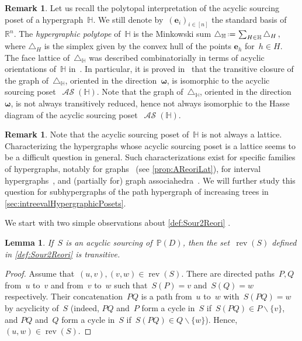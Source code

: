 \documentclass{amsart}
\newtheorem{lemma}[theorem]{Lemma}
\theoremstyle{definition}
\newtheorem{remark}[theorem]{Remark}
\newcommand{\R}{\mathbb{R}} %
\renewcommand{\b}[1]{\boldsymbol{#1}} %
\newcommand{\ssm}{\smallsetminus} %
\newcommand{\eqdef}{\mbox{\,\raisebox{0.2ex}{\scriptsize\ensuremath{\mathrm:}}\ensuremath{=}\,}} %
\newcommand{\simplex}{\triangle} %
\newcommand{\darkblue}{\color{darkblue}} %
\newcommand{\defn}[1]{\textsl{\darkblue #1}} %
\DeclareMathOperator{\rev}{rev} %
\DeclareMathOperator{\ASour}{\mathcal{AS}}  %
\newcommand{\HH}{\mathbb H}  %
\newcommand{\PP}{\mathbb P} %
\begin{document}
\begin{remark}
Let us recall the polytopal interpretation of the acyclic sourcing poset of a hypergraph~$\HH$.
We still denote by~$(\b{e}_i)_{i \in [n]}$ the standard basis of~$\R^n$.
The \defn{hypergraphic polytope} of~$\HH$ is the Minkowski sum
\(
\simplex_\HH \eqdef \sum_{H\in \HH} \simplex_H\,,
\)
where $\simplex_H$ is the simplex given by the convex hull of the points $\b{e}_h$ for~$h \in H$.
The face lattice of~$\simplex_\HH$ was described combinatorially in terms of acyclic orientations of~$\HH$ in~\cite{BenedettiBergeronMachacek}.
In particular, it is proved in~\cite{Gelinas} that the transitive closure of the graph of~$\simplex_\HH$, oriented in the direction~$\b{\omega}$, is isomorphic to the acyclic sourcing poset~$\ASour(\HH)$.
Note that the graph of~$\simplex_\HH$, oriented in the direction~$\b{\omega}$, is not always transitively reduced, hence not always isomorphic to the Hasse diagram of the acyclic sourcing poset~$\ASour(\HH)$.
\end{remark}

\begin{remark}
\label{rem:ASourLat}
Note that the acyclic sourcing poset of~$\HH$ is not always a lattice.
Characterizing the hypergraphs whose acyclic sourcing poset is a lattice seems to be a difficult question in general.
Such characterizations exist for specific families of hypergraphs, notably for graphs~\cite{Pilaud-acyclicReorientationLattices} (see \cref{prop:AReoriLat}), for interval hypergraphs~\cite{BergeronPilaud}, and (partially for) graph associahedra~\cite{BarnardMcConville}.
We will further study this question for subhypergraphs of the path hypergraph of increasing trees in \cref{sec:intreevalHypergraphicPosets}.
\end{remark}

We start with two simple observations about \cref{def:Sour2Reori} .

\begin{lemma}
\label{lem:revTCAcyclic}
If~$S$ is an acyclic sourcing of~$\PP(D)$, then the set~$\rev(S)$ defined in \cref{def:Sour2Reori} is transitive.
\end{lemma}

\begin{proof}
Assume that~$(u,v), (v,w) \in \rev(S)$.
There are directed paths~$P, Q$ from~$u$ to~$v$ and from~$v$ to~$w$ such that~$S(P) = v$ and~$S(Q) = w$ respectively.
Their concatenation~$PQ$ is a path from~$u$ to~$w$ with~$S(PQ) = w$ by acyclicity of~$S$ (indeed, $PQ$ and~$P$ form a cycle in~$S$ if~$S(PQ) \in P \ssm \{v\}$, and $PQ$ and~$Q$ form a cycle in~$S$ if~$S(PQ) \in Q \ssm \{w\}$).
Hence,~$(u,w) \in \rev(S)$.
\end{proof}
\end{document}
